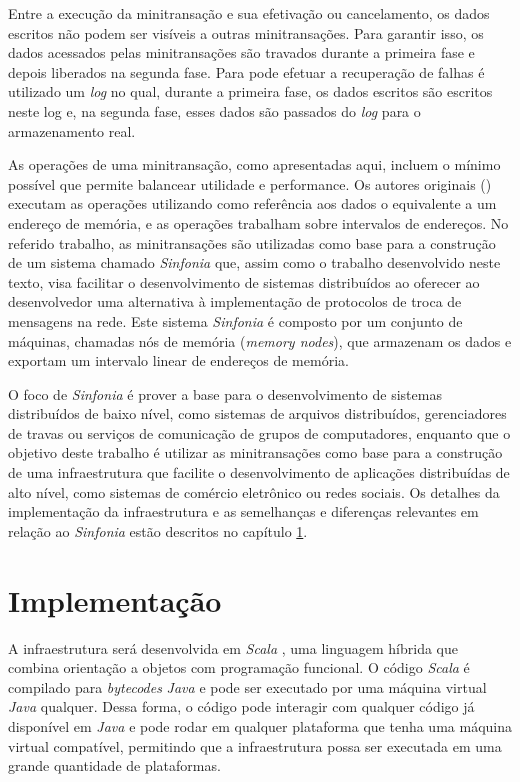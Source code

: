 \documentclass[11pt,twoside,a4paper]{book}
\begin{document}
Entre a execução da minitransação e sua efetivação ou cancelamento, os dados escritos não podem ser visíveis a outras minitransações. Para garantir isso, os dados acessados pelas minitransações são travados durante a primeira fase e depois liberados na segunda fase. Para pode efetuar a recuperação de falhas é utilizado um \emph{log} no qual, durante a primeira fase, os dados escritos são escritos neste log e, na segunda fase, esses dados são passados do \emph{log} para o armazenamento real.

As operações de uma minitransação, como apresentadas aqui, incluem o mínimo possível que permite balancear utilidade e performance. Os autores originais (\cite{sinfonia}) executam as operações utilizando como referência aos dados o equivalente a um endereço de memória, e as operações trabalham sobre intervalos de endereços. No referido trabalho, as minitransações são utilizadas como base para a construção de um sistema chamado \emph{Sinfonia} que, assim como o trabalho desenvolvido neste texto, visa facilitar o desenvolvimento de sistemas distribuídos ao oferecer ao desenvolvedor uma alternativa à implementação de protocolos de troca de mensagens na rede. Este sistema \emph{Sinfonia} é composto por um conjunto de máquinas, chamadas nós de memória (\emph{memory nodes}), que armazenam os dados e exportam um intervalo linear de endereços de memória. 

O foco de \emph{Sinfonia} é prover a base para o desenvolvimento de sistemas distribuídos de baixo nível, como sistemas de arquivos distribuídos, gerenciadores de travas ou serviços de comunicação de grupos de computadores, enquanto que o objetivo deste trabalho é utilizar as minitransações como base para a construção de uma infraestrutura que facilite o desenvolvimento de aplicações distribuídas de alto nível, como sistemas de comércio eletrônico ou redes sociais. Os detalhes da implementação da infraestrutura e as semelhanças e diferenças relevantes em relação ao \emph{Sinfonia} estão descritos no capítulo \ref{chap:implementacao}.

\chapter{Implementação}
\label{chap:implementacao}

A infraestrutura será desenvolvida em \emph{Scala} \cite{scala}, uma linguagem híbrida que combina orientação a objetos com programação funcional. O código \emph{Scala} é compilado para \emph{bytecodes} \emph{Java} e pode ser executado por uma máquina virtual \emph{Java} qualquer. Dessa forma, o código pode interagir com qualquer código já disponível em \emph{Java} e pode rodar em qualquer plataforma que tenha uma máquina virtual compatível, permitindo que a infraestrutura possa ser executada em uma grande quantidade de plataformas.
\end{document}
